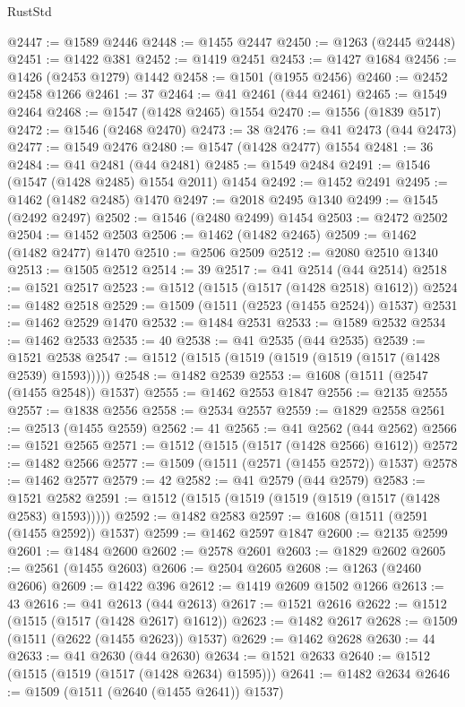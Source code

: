 \begin{lexlean}{RustStd}
\begin{coremodule}
@2447 := @1589 @2446
@2448 := @1455 @2447
@2450 := @1263 (@2445 @2448)
@2451 := @1422 @381
@2452 := @1419 @2451
@2453 := @1427 @1684
@2456 := @1426 (@2453 @1279) @1442
@2458 := @1501 (@1955 @2456)
@2460 := @2452 @2458 @1266
@2461 := 37
@2464 := @41 @2461 (@44 @2461)
@2465 := @1549 @2464
@2468 := @1547 (@1428 @2465) @1554
@2470 := @1556 (@1839 @517)
@2472 := @1546 (@2468 @2470)
@2473 := 38
@2476 := @41 @2473 (@44 @2473)
@2477 := @1549 @2476
@2480 := @1547 (@1428 @2477) @1554
@2481 := 36
@2484 := @41 @2481 (@44 @2481)
@2485 := @1549 @2484
@2491 := @1546 (@1547 (@1428 @2485) @1554 @2011) @1454
@2492 := @1452 @2491
@2495 := @1462 (@1482 @2485) @1470
@2497 := @2018 @2495 @1340
@2499 := @1545 (@2492 @2497)
@2502 := @1546 (@2480 @2499) @1454
@2503 := @2472 @2502
@2504 := @1452 @2503
@2506 := @1462 (@1482 @2465)
@2509 := @1462 (@1482 @2477) @1470
@2510 := @2506 @2509
@2512 := @2080 @2510 @1340
@2513 := @1505 @2512
@2514 := 39
@2517 := @41 @2514 (@44 @2514)
@2518 := @1521 @2517
@2523 := @1512 (@1515 (@1517 (@1428 @2518) @1612))
@2524 := @1482 @2518
@2529 := @1509 (@1511 (@2523 (@1455 @2524)) @1537)
@2531 := @1462 @2529 @1470
@2532 := @1484 @2531
@2533 := @1589 @2532
@2534 := @1462 @2533
@2535 := 40
@2538 := @41 @2535 (@44 @2535)
@2539 := @1521 @2538
@2547 := @1512 (@1515 (@1519 (@1519 (@1519 (@1517 (@1428 @2539) @1593)))))
@2548 := @1482 @2539
@2553 := @1608 (@1511 (@2547 (@1455 @2548)) @1537)
@2555 := @1462 @2553 @1847
@2556 := @2135 @2555
@2557 := @1838 @2556
@2558 := @2534 @2557
@2559 := @1829 @2558
@2561 := @2513 (@1455 @2559)
@2562 := 41
@2565 := @41 @2562 (@44 @2562)
@2566 := @1521 @2565
@2571 := @1512 (@1515 (@1517 (@1428 @2566) @1612))
@2572 := @1482 @2566
@2577 := @1509 (@1511 (@2571 (@1455 @2572)) @1537)
@2578 := @1462 @2577
@2579 := 42
@2582 := @41 @2579 (@44 @2579)
@2583 := @1521 @2582
@2591 := @1512 (@1515 (@1519 (@1519 (@1519 (@1517 (@1428 @2583) @1593)))))
@2592 := @1482 @2583
@2597 := @1608 (@1511 (@2591 (@1455 @2592)) @1537)
@2599 := @1462 @2597 @1847
@2600 := @2135 @2599
@2601 := @1484 @2600
@2602 := @2578 @2601
@2603 := @1829 @2602
@2605 := @2561 (@1455 @2603)
@2606 := @2504 @2605
@2608 := @1263 (@2460 @2606)
@2609 := @1422 @396
@2612 := @1419 @2609 @1502 @1266
@2613 := 43
@2616 := @41 @2613 (@44 @2613)
@2617 := @1521 @2616
@2622 := @1512 (@1515 (@1517 (@1428 @2617) @1612))
@2623 := @1482 @2617
@2628 := @1509 (@1511 (@2622 (@1455 @2623)) @1537)
@2629 := @1462 @2628
@2630 := 44
@2633 := @41 @2630 (@44 @2630)
@2634 := @1521 @2633
@2640 := @1512 (@1515 (@1519 (@1517 (@1428 @2634) @1595)))
@2641 := @1482 @2634
@2646 := @1509 (@1511 (@2640 (@1455 @2641)) @1537)

\end{coremodule}
\end{lexlean}
